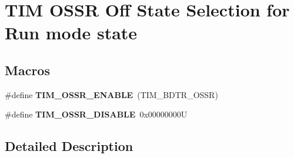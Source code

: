 \hypertarget{group___t_i_m___o_s_s_r___off___state___selection__for___run__mode__state}{}\section{T\+IM O\+S\+SR Off State Selection for Run mode state}
\label{group___t_i_m___o_s_s_r___off___state___selection__for___run__mode__state}
\subsection*{Macros}
\begin{DoxyCompactItemize}
\item 
\mbox{\label{group___t_i_m___o_s_s_r___off___state___selection__for___run__mode__state_ga5d21918f173eca946748a1fbc177daa5}} 
\#define {\bfseries T\+I\+M\+\_\+\+O\+S\+S\+R\+\_\+\+E\+N\+A\+B\+LE}~(T\+I\+M\+\_\+\+B\+D\+T\+R\+\_\+\+O\+S\+SR)
\item 
\mbox{\label{group___t_i_m___o_s_s_r___off___state___selection__for___run__mode__state_gae11820b467ef6d74c90190c8cfce5e73}} 
\#define {\bfseries T\+I\+M\+\_\+\+O\+S\+S\+R\+\_\+\+D\+I\+S\+A\+B\+LE}~0x00000000U
\end{DoxyCompactItemize}


\subsection{Detailed Description}
